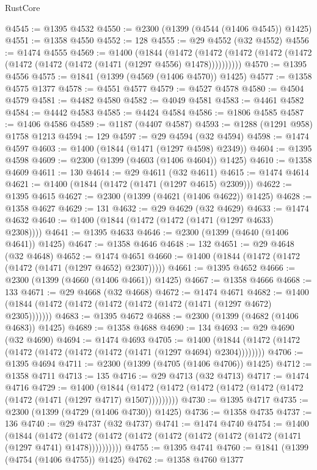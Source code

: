 \begin{lexlean}{RustCore}
\begin{coremodule}
@4545 := @1395 @4532
@4550 := @2300 (@1399 (@4544 (@1406 @4545)) @1425)
@4551 := @1358 @4550
@4552 := 128
@4555 := @29 @4552 (@32 @4552)
@4556 := @1474 @4555
@4569 := @1400
    (@1844
      (@1472 (@1472 (@1472 (@1472 (@1472 (@1472 (@1472 (@1472 (@1471 (@1297 @4556) @1478))))))))))
@4570 := @1395 @4556
@4575 := @1841 (@1399 (@4569 (@1406 @4570)) @1425)
@4577 := @1358 @4575 @1377
@4578 := @4551 @4577
@4579 := @4527 @4578
@4580 := @4504 @4579
@4581 := @4482 @4580
@4582 := @4049 @4581
@4583 := @4461 @4582
@4584 := @4442 @4583
@4585 := @4424 @4584
@4586 := @1806 @4585
@4587 := @1406 @4586
@4589 := @1187 (@4407 @4587)
@4593 := @1288 (@1291 @958) @1758 @1213
@4594 := 129
@4597 := @29 @4594 (@32 @4594)
@4598 := @1474 @4597
@4603 := @1400 (@1844 (@1471 (@1297 @4598) @2349))
@4604 := @1395 @4598
@4609 := @2300 (@1399 (@4603 (@1406 @4604)) @1425)
@4610 := @1358 @4609
@4611 := 130
@4614 := @29 @4611 (@32 @4611)
@4615 := @1474 @4614
@4621 := @1400 (@1844 (@1472 (@1471 (@1297 @4615) @2309)))
@4622 := @1395 @4615
@4627 := @2300 (@1399 (@4621 (@1406 @4622)) @1425)
@4628 := @1358 @4627
@4629 := 131
@4632 := @29 @4629 (@32 @4629)
@4633 := @1474 @4632
@4640 := @1400 (@1844 (@1472 (@1472 (@1471 (@1297 @4633) @2308))))
@4641 := @1395 @4633
@4646 := @2300 (@1399 (@4640 (@1406 @4641)) @1425)
@4647 := @1358 @4646
@4648 := 132
@4651 := @29 @4648 (@32 @4648)
@4652 := @1474 @4651
@4660 := @1400 (@1844 (@1472 (@1472 (@1472 (@1471 (@1297 @4652) @2307)))))
@4661 := @1395 @4652
@4666 := @2300 (@1399 (@4660 (@1406 @4661)) @1425)
@4667 := @1358 @4666
@4668 := 133
@4671 := @29 @4668 (@32 @4668)
@4672 := @1474 @4671
@4682 := @1400 (@1844 (@1472 (@1472 (@1472 (@1472 (@1472 (@1471 (@1297 @4672) @2305)))))))
@4683 := @1395 @4672
@4688 := @2300 (@1399 (@4682 (@1406 @4683)) @1425)
@4689 := @1358 @4688
@4690 := 134
@4693 := @29 @4690 (@32 @4690)
@4694 := @1474 @4693
@4705 := @1400 (@1844 (@1472 (@1472 (@1472 (@1472 (@1472 (@1472 (@1471 (@1297 @4694) @2304))))))))
@4706 := @1395 @4694
@4711 := @2300 (@1399 (@4705 (@1406 @4706)) @1425)
@4712 := @1358 @4711
@4713 := 135
@4716 := @29 @4713 (@32 @4713)
@4717 := @1474 @4716
@4729 := @1400
    (@1844 (@1472 (@1472 (@1472 (@1472 (@1472 (@1472 (@1472 (@1471 (@1297 @4717) @1507)))))))))
@4730 := @1395 @4717
@4735 := @2300 (@1399 (@4729 (@1406 @4730)) @1425)
@4736 := @1358 @4735
@4737 := 136
@4740 := @29 @4737 (@32 @4737)
@4741 := @1474 @4740
@4754 := @1400
    (@1844
      (@1472 (@1472 (@1472 (@1472 (@1472 (@1472 (@1472 (@1472 (@1471 (@1297 @4741) @1478))))))))))
@4755 := @1395 @4741
@4760 := @1841 (@1399 (@4754 (@1406 @4755)) @1425)
@4762 := @1358 @4760 @1377

\end{coremodule}
\end{lexlean}
